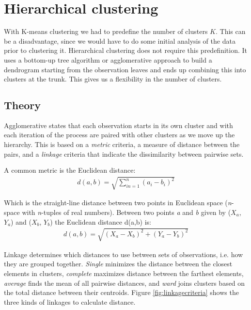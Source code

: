 \section{Hierarchical clustering}

With K-means clustering we had to predefine the number of clusters $K$. This can be a disadvantage, since we would have to do some initial analysis of the data prior to clustering it. Hierarchical clustering does not require this predefinition. It uses a bottom-up tree algorithm or agglomerative approach to build a dendrogram starting from the observation leaves and ends up combining this into clusters at the trunk. This gives us a flexibility in the number of clusters.

\subsection{Theory}

Agglomerative states that each observation starts in its own cluster and with each iteration of the process are paired with other clusters as we move up the hierarchy.  This is based on a \textit{metric} criteria, a measure of distance between the pairs, and a \textit{linkage} criteria that indicate the dissimilarity between pairwise sets.

A common metric is the Euclidean distance:
\begin{align}
	d(a,b) = \sqrt{\sum_{in=1}^{n} (a_{i} - b_{i})^{2}}  %
\end{align}

Which is the straight-line distance between two points in Euclidean space (\textit{n}-space with \textit{n}-tuples of real numbers). Between two points \textit{a} and \textit{b} given by ($X_a$, $Y_a$) and ($X_b$, $Y_b$) the Euclidean distance d(a,b) is:
\begin{align}
	d(a,b) = \sqrt{(X_a - X_b)^2 + (Y_a - Y_b)^2}
\end{align}

Linkage determines which distances to use between sets of observations, i.e. how they are grouped together. \textit{Single} minimizes the distance between the closest elements in clusters, \textit{complete} maximizes distance between the farthest elements, \textit{average} finds the mean of all pairwise distances, and \textit{ward} joins clusters based on the total distance between their centroids. Figure \ref{fig:linkagecriteria} shows the three kinds of linkages to calculate distance.

